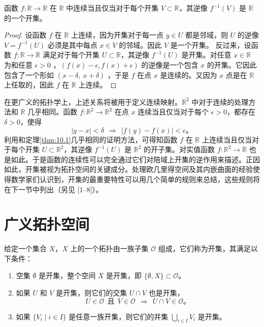 \begin{theorem}\label{thm:10.1} 
     函数 $f:\mathbb{R}\rightarrow \mathbb{R}$ 在 $\mathbb{R}$ 中连续当且仅当对于每个开集 $V\subset \mathbb{R}$，其逆像 $f^{-1} (V)$ 是 $\mathbb{R}$ 的一个开集。
\end{theorem}
\begin{proof}
设函数 $ f$ 在 $ \mathbb{R}$ 上连续，因为开集对于每一点 $ y\in U$ 都是邻域，则 $ U$ 的逆像 $ V=f^{-1}( U)$ 必须是其中每点 $ x\in V$ 的邻域。因此 $ V$ 是一个开集。
    反过来，设函数 $f:\mathbb{R}\rightarrow \mathbb{R}$ 满足对于每个开集 $U\subset \mathbb{R}$，其逆像 $f^{-1} (U)$ 是开集。对任意 $x\in \mathbb{R}$ 为和任意 $\epsilon  >0$ ，$(f(x)-\epsilon ,f(x)+\epsilon )$ 的逆像是一个包含 $ x$ 的开集。它因此包含了一个形如 $ ( x-\delta ,\ x+\delta )$ ，于是 $ f$ 在点 $ x$ 是连续的。又因为 $ x$ 点是在 $\mathbb{R}$ 上任取的，因此 $ f$ 在 $\mathbb{R}$ 上连续。
\end{proof}
    在更广义的拓扑学上，上述关系将被用于定义连续映射。$\mathbb{R}^{2}$ 中对于连续的处理方法和 $ \mathbb{R}$ 几乎相同。函数 $f:\mathbb{R}^{2}\rightarrow \mathbb{R}^{2}$ 在点 $x$ 连续当且仅当对于每个 $\epsilon  >0$，都存在 $\delta  >0$，使得
\begin{equation*}
    |y-x|< \delta \ \ \Rightarrow \ \ |f(y)-f(x)|< \epsilon 。
\end{equation*}
利用和定理\ref{thm:10.1}几乎相同的证明方法，可得知函数 $f$ 在 $ \mathbb{R}$ 上连续当且仅当对于每个开集 $U\subset \mathbb{R}^{2}$，其逆像 $f^{-1} (U)$ 是 $\mathbb{R}^{2}$ 的开子集。对实值函数 $f:\mathbb{R}^{2}\rightarrow \mathbb{R}$ 也是如此。于是函数的连续性可以完全通过它们对陪域上开集的逆作用来描述。正因如此，开集被视为拓扑空间的关键成分。处理欧几里得空间及其内嵌曲面的经验使得数学家们认识到，开集的最重要特性可以用几个简单的规则来总结，这些规则将在下一节中列出（另见 [1–8]）。

\section{广义拓扑空间}

给定一个集合 $X$，$X$ 上的一个拓扑由一族子集 $\mathcal{O}$ 组成，它们称为开集，其满足以下条件：

\begin{enumerate}[label=(Top\arabic*),ref=Top\arabic*]
	\item \label{top:1}
	空集 $\emptyset $ 是开集，整个空间 $X$ 是开集，即 $\{\emptyset ,X\}\subset \mathcal{O}$。
	\item \label{top:2}
	如果 $U$ 和 $V$ 是开集，则它们的交集 $U\cap V$ 也是开集，
\begin{equation*}
    U\in \mathcal{O} \ \ \text{且} \ \ V\in \mathcal{O} \ \ \Rightarrow \ \ U\cap V\in \mathcal{O} 。
\end{equation*}
	\item \label{top:3}
	如果 $\{V_{i} \mid i\in I\}$ 是任意一族开集，则它们的并集 $\bigcup _{i\in I} V_{i}$ 是开集。
\end{enumerate}

